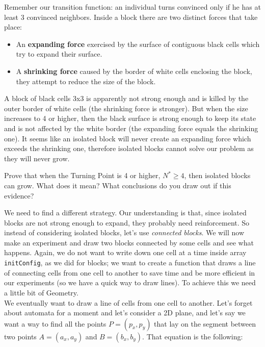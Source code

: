Remember our transition function:
an individual turns convinced only if he has at least 3 convinced neighbors.
Inside a block there are two distinct forces that take place:

\begin{itemize}
\item An \textbf{expanding force} exercised by the surface of contiguous black cells which
try to expand their surface.
\item A \textbf{shrinking force} caused by the border of white cells enclosing the block, they
attempt to reduce the size of the block.
\end{itemize}

A block of
black cells 3x3 is apparently not strong enough and is killed by the outer border of white cells
(the shrinking force is stronger).
But when the size increases to 4 or higher, then the black surface is strong enough to keep its state
and is not affected by the white border (the expanding force equals the shrinking one).
It seems like an isolated block will never create an expanding force which exceeds the shrinking one,
therefore isolated blocks cannot solve our problem as they will never grow.

\begin{problem}
\label{prob:highernblockslive}
Prove that when the Turning Point is 4 or higher, $N^\ast \geq 4$, then isolated blocks can grow.
What does it mean? What conclusions do you draw out if this evidence?
\end{problem}

We need to find a different strategy. Our understanding is that, since isolated blocks are not
strong enough to expand, they probably need reinforcement. So instead of considering isolated
blocks, let's use \textit{connected blocks}. We will now make an experiment and draw two blocks
connected by some cells and see what happens. Again, we do not want to write down one cell at a time
inside array \texttt{initConfig}, as we did for blocks;
we want to create a function that
draws a line of connecting cells from one cell to another to save time and be more efficient
in our experiments (so we have a quick way to draw lines). To achieve this we need a little bit
of Geometry.\\

We eventually want to draw a line of cells from one cell to another. Let's forget about
automata for a moment and let's consider a 2D plane, and let's say we want a way to find
all the points $P = (p_x, p_y)$ that lay on
the segment between two points $A = (a_x, a_y)$ and $B = (b_x, b_y)$.
That equation is the following:

